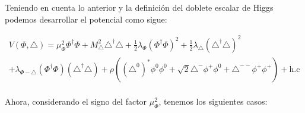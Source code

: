 \documentclass[12pt]{article}
\begin{document}
Teniendo en cuenta lo anterior y la definición del doblete escalar de 
Higgs podemos desarrollar el potencial como sigue: 


\begin{equation}
    \begin{aligned}
    \label{eq:POtencialMAjorana1}
V(\Phi, \triangle)= \mu^2_\Phi\Phi^\dagger\Phi + M^2_\triangle\triangle^\dagger\triangle +  \frac{1}{2}\lambda_\Phi (\Phi^\dagger\Phi)^2 + 
\frac{1}{2}\lambda_\triangle (\triangle^\dagger\triangle)^2 \\ 
+ \lambda_{\Phi-\triangle} (\Phi^\dagger\Phi)(\triangle^\dagger\triangle)
+ \rho((\triangle^{0})^*\phi^0\phi^0 + \sqrt{2}\triangle^-\phi^+\phi^0+\triangle^{--}\phi^{+}\phi^{+} ) + \text{h.c}
    \end{aligned}
\end{equation} \\


Ahora, considerando el signo del factor $\mu^2_\Phi$, tenemos los siguientes casos:
\end{document}
